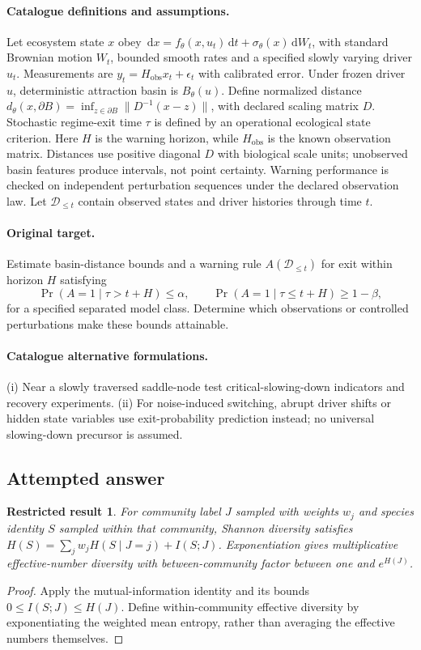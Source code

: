 \documentclass[11pt]{article}
\newcommand{\dd}{\,\mathrm d}
\newtheorem{attemptresult}{Restricted result}[section]
\begin{document}
\paragraph{Catalogue definitions and assumptions.}
Let ecosystem state $x$ obey $\dd x=f_\theta(x,u_t)\dd t+\sigma_\theta(x)\dd W_t$, with standard Brownian motion $W_t$, bounded smooth rates and a specified slowly varying driver $u_t$. Measurements are $y_t=H_{\mathrm{obs}}x_t+\epsilon_t$ with calibrated error. Under frozen driver $u$, deterministic attraction basin is $B_\theta(u)$. Define normalized distance $d_\theta(x,\partial B)=\inf_{z\in\partial B}\|D^{-1}(x-z)\|$, with declared scaling matrix $D$. Stochastic regime-exit time $\tau$ is defined by an operational ecological state criterion. Here $H$ is the warning horizon, while $H_{\mathrm{obs}}$ is the known observation matrix. Distances use positive diagonal $D$ with biological scale units; unobserved basin features produce intervals, not point certainty. Warning performance is checked on independent perturbation sequences under the declared observation law. Let $\mathcal D_{\le t}$ contain observed states and driver histories through time $t$.
\paragraph{Original target.}
Estimate basin-distance bounds and a warning rule $A(\mathcal D_{\le t})$ for exit within horizon $H$ satisfying
\[
 \Pr(A=1\mid\tau>t+H)\le\alpha,
 \qquad \Pr(A=1\mid\tau\le t+H)\ge1-\beta,
\]
for a specified separated model class. Determine which observations or controlled perturbations make these bounds attainable.
\paragraph{Catalogue alternative formulations.}
(i) Near a slowly traversed saddle-node test critical-slowing-down indicators and recovery experiments. (ii) For noise-induced switching, abrupt driver shifts or hidden state variables use exit-probability prediction instead; no universal slowing-down precursor is assumed.
\subsection{Attempted answer}
\begin{attemptresult}
For community label $J$ sampled with weights $w_j$ and species identity $S$ sampled within that community, Shannon diversity satisfies $H(S)=\sum_jw_jH(S\mid J=j)+I(S;J)$. Exponentiation gives multiplicative effective-number diversity with between-community factor between one and $e^{H(J)}$.
\end{attemptresult}
\begin{proof}
Apply the mutual-information identity and its bounds $0\leq I(S;J)\leq H(J)$. Define within-community effective diversity by exponentiating the weighted mean entropy, rather than averaging the effective numbers themselves.
\end{proof}
\end{document}
